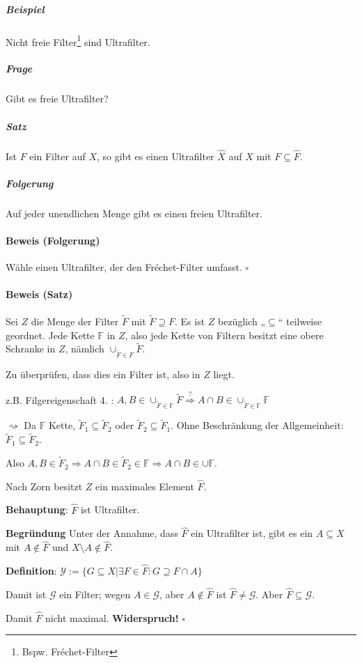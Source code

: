 \documentclass[14pt,a4paper]{article}
\begin{document}
		\subparagraph{Beispiel}
			Nicht freie Filter\footnote{Bspw. Fréchet-Filter} sind Ultrafilter.
		\subparagraph{Frage}
			Gibt es freie Ultrafilter?
		\subparagraph{Satz}
			Ist $F$ ein Filter auf $X$, so gibt es einen Ultrafilter $\hat{X}$ auf $X$ mit $F \subseteq \hat{F}$.
		\subparagraph{Folgerung}
			Auf jeder unendlichen Menge gibt es einen freien Ultrafilter.
		\paragraph{Beweis (Folgerung)}
			Wähle einen Ultrafilter, der den Fréchet-Filter umfasst.
			$\square$
		\paragraph{Beweis (Satz)}
			Sei $Z$ die Menge der Filter $\widetilde{F}$ mit $\widetilde{F} \supseteq F$.
			Es ist $Z$ bezüglich „$\subseteq$“ teilweise geordnet.
			Jede Kette $\mathbb{F}$ in $Z$, also jede Kette von Filtern besitzt eine obere Schranke in $Z$, nämlich $\cup_{\widetilde{F} \in F} \widetilde{F} $.

			Zu überprüfen, dass dies ein Filter ist, also in $Z$ liegt.\
			
			z.B. Filgereigenschaft 4. : $A,B \in \cup_{\widetilde{F} \in \mathbb{F}} \widetilde{F} \stackrel{?}{\Rightarrow} A \cap B \in \cup_{\tilde{F} \in \mathbb{F}} \mathbb{F}$

			$\rightsquigarrow$ Da $\mathbb{F}$ Kette,  $\tilde{F}_1 \subseteq \tilde{F}_2$ oder $\tilde{F}_2 \subseteq \tilde{F}_1$.
			Ohne Beschränkung der Allgemeinheit: $\tilde{F}_1 \subseteq \tilde{F}_2$.

			Also $A,B \in \tilde{F}_2 \Rightarrow A \cap B \in \tilde{F}_2 \in \mathbb{F} \Rightarrow A \cap B \in \cup \mathbb{F}$.

			Nach Zorn besitzt $Z$ ein maximales Element $\hat{F}$.

			\textbf{Behauptung}: $\hat{F}$ ist Ultrafilter.

			\textbf{Begründung}
			Unter der Annahme, dass $\hat{F}$ ein Ultrafilter ist, gibt es ein $A \subseteq X$ mit $A \notin \hat{F}$ und $X \setminus A \notin \hat{F}$.
			
			\textbf{Definition}:
			$\mathscr{Y} := \{ G \subseteq X | \exists F \in \hat{F} : G \supseteq F \cap A\}$

			Damit ist $\mathscr{G}$ ein Filter; wegen $A \in \mathscr{G}$, aber $A \notin \hat{F}$ ist $\hat{F} \neq \mathscr{G}$.
			Aber $\hat{F} \subseteq \mathscr{G}$.

			Damit $\hat{F}$ nicht maximal. \textbf{Widerspruch!}
			$\square$
\end{document}
